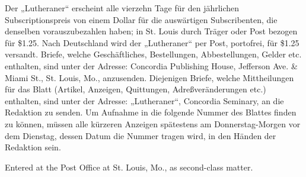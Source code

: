 \trenner

Der „Lutheraner“ erscheint alle vierzehn Tage für den jährlichen Subscriptionspreis von einem Dollar für die auswärtigen Subscribenten, die denselben vorauszubezahlen haben; in St. Louis durch Träger oder Post bezogen für \$1.25.
Nach Deutschland wird der „Lutheraner“ per Post, portofrei, für \$1.25 versandt.
Briefe, welche Geschäftliches, Bestellungen, Abbestellungen, Gelder etc. enthalten, sind unter der Adresse: Concordia Publishing House, Jefferson Ave. \& Miami St., St. Louis, Mo., anzusenden.
Diejenigen Briefe, welche Mittheilungen für das Blatt (Artikel, Anzeigen, Quittungen, Adreßveränderungen etc.) enthalten, sind unter der Adresse: „Lutheraner“, Concordia Seminary, an die Redaktion zu senden. Um Aufnahme in die folgende Nummer des Blattes finden zu können, müssen alle kürzeren Anzeigen spätestens am Donnerstag-Morgen vor dem Dienstag, dessen Datum die Nummer tragen wird, in den Händen der Redaktion sein.

Entered at the Post Office at St. Louis, Mo., as second-class matter.
